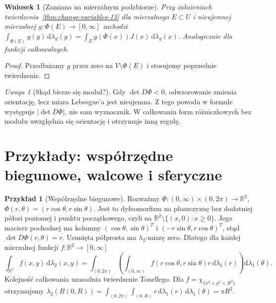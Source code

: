 \documentclass[11pt,a4paper,oneside]{book}
\numberwithin{equation}{chapter}
\theoremstyle{plain}
\newtheorem{wniosek}[twierdzenie]{Wniosek}
\theoremstyle{definition}
\newtheorem{przyklad}[twierdzenie]{Przykład}
\theoremstyle{remark}
\newtheorem{uwaga}[twierdzenie]{Uwaga}
\begin{document}
\begin{wniosek}[Zamiana na mierzalnym podzbiorze]
\label{cor:change-subdomain-13}
Przy założeniach twierdzenia~\ref{thm:change-variables-13}
dla mierzalnego $E\subset U$ i nieujemnej
mierzalnej $g:\Phi(E)\to[0,\infty]$ zachodzi
$\int_{\Phi(E)}g(y)\,\mathrm d\lambda_d(y)
=\int_E g(\Phi(x))J(x)\,\mathrm d\lambda_d(x)$.
Analogicznie dla funkcji całkowalnych.
\end{wniosek}
\begin{proof}
Przedłużamy $g$ przez zero na $V\setminus\Phi(E)$
i stosujemy poprzednie twierdzenie.
\end{proof}

\begin{uwaga}[Skąd bierze się moduł?]
Gdy $\det D\Phi<0$, odwzorowanie zmienia orientację,
lecz miara Lebesgue'a jest nieujemna. Z tego powodu
w formule występuje $|\det D\Phi|$, nie sam wyznacznik.
W całkowaniu form różniczkowych bez modułu uwzględnia się
orientację i otrzymuje inną regułę.
\end{uwaga}

\section{Przykłady: współrzędne biegunowe, walcowe i sferyczne}

\begin{przyklad}[Współrzędne biegunowe]
\label{ex:polar-13}
Rozważmy $\Phi:(0,\infty)\times(0,2\pi)\to\mathbb R^2$,
$\Phi(r,\theta)=(r\cos\theta,r\sin\theta)$.
Jest to dyfeomorfizm na płaszczyznę bez dodatniej
półosi poziomej i punktu początkowego, czyli na
$\mathbb R^2\setminus\{(x,0):x\ge0\}$.
Jego macierz pochodnej ma kolumny
$(\cos\theta,\sin\theta)^T$ i
$(-r\sin\theta,r\cos\theta)^T$, stąd
$\det D\Phi(r,\theta)=r$. Usunięta półprosta ma
$\lambda_2$-miarę zero. Dlatego dla każdej
mierzalnej funkcji $f:\mathbb R^2\to[0,\infty]$
\begin{equation}\label{eq:polar-13}
\int_{\mathbb R^2}f(x,y)\,\mathrm d\lambda_2(x,y)
=\int_{(0,2\pi)}\left(\int_{(0,\infty)}
 f(r\cos\theta,r\sin\theta)r\,\mathrm d\lambda_1(r)\right)
\mathrm d\lambda_1(\theta).
\end{equation}
Kolejność całkowania uzasadnia twierdzenie Tonellego.
Dla $f=\chi_{\{x^2+y^2<R^2\}}$ otrzymujemy
$\lambda_2(B(0,R))=\int_{(0,2\pi)}\int_{(0,R)}r\,
\mathrm d\lambda_1(r)\,\mathrm d\lambda_1(\theta)=\pi R^2$.
\end{przyklad}
\end{document}
